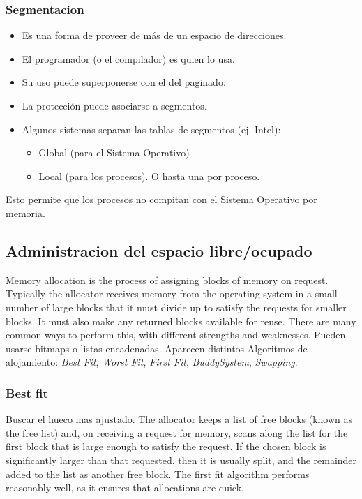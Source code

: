 \documentclass[a4paper, twoside]{article}
\begin{document}
\subsubsection{Segmentacion}
\begin{itemize}
	\item Es una forma de proveer de más de un espacio de direcciones.
	\item El programador (o el compilador) es quien lo usa.
	\item Su uso puede superponerse con el del paginado.
	\item La protección puede asociarse a segmentos.
	\item Algunos sistemas separan las tablas de segmentos (ej. Intel):
	\begin{itemize}
		\item Global (para el Sistema Operativo)
		\item Local (para los procesos). O hasta una por proceso.
	\end{itemize}
\end{itemize}
Esto permite que los procesos no compitan con el Sistema Operativo por memoria.

\subsection{Administracion del espacio libre/ocupado}
Memory allocation is the process of assigning blocks of memory on request. Typically the allocator receives memory from the operating system in a small number of large blocks that it must divide up to satisfy the requests for smaller blocks. It must also make any returned blocks available for reuse. There are many common ways to perform this, with different strengths and weaknesses.
Pueden usarse bitmaps o listas encadenadas. Aparecen distintos Algoritmos de alojamiento: \emph{Best Fit}, \emph{Worst Fit}, \emph{First Fit}, \emph{BuddySystem}, \emph{Swapping}.

\subsubsection{Best fit}
Buscar el hueco mas ajustado.
The allocator keeps a list of free blocks (known as the free list) and, on receiving a request for memory, scans along the list for the first block that is large enough to satisfy the request. If the chosen block is significantly larger than that requested, then it is usually split, and the remainder added to the list as another free block. The first fit algorithm performs reasonably well, as it ensures that allocations are quick.
\end{document}
